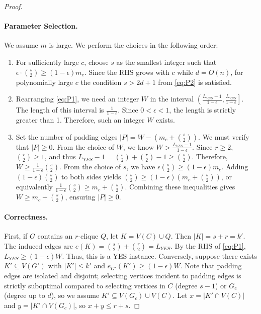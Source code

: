 \begin{proof}
\paragraph{Parameter Selection.}
We assume $m$ is large. We perform the choices in the following order:
\begin{enumerate}
    \item For sufficiently large $c$, choose $s$ as the smallest integer such that $\epsilon \cdot \binom{s}{2} \ge (1-\epsilon) m_c$. Since the RHS grows with $c$ while $d = O(n)$, for polynomially large $c$ the condition $s > 2d +1$ from \eqref{eq:P2} is satisfied.
    
    \item Rearranging \eqref{eq:P1}, we need an integer $W$ in the interval  $ \left( \frac{L_{YES}-1}{1-\epsilon}, \frac{L_{YES}}{1-\epsilon} \right]. $ The length of this interval is $\frac{1}{1-\epsilon}$. Since $0 < \epsilon < 1$, the length is strictly greater than 1. Therefore, such an integer $W$ exists.
    
    \item Set the number of padding edges $|P| = W - (m_c + \binom{s}{2})$. We must verify that $|P| \ge 0$. 
    From the choice of $W$, we know $W > \frac{L_{YES}-1}{1-\epsilon}$. Since $r \ge 2$, $\binom{r}{2} \ge 1$, and thus $L_{YES} - 1 = \binom{s}{2} + \binom{r}{2} - 1 \ge \binom{s}{2}$.
    Therefore, $W \ge \frac{1}{1-\epsilon} \binom{s}{2}$.
    From the choice of $s$, we have $\epsilon \binom{s}{2} \ge (1-\epsilon)m_c$. Adding $(1-\epsilon)\binom{s}{2}$ to both sides yields $\binom{s}{2} \ge (1-\epsilon)(m_c + \binom{s}{2})$, or equivalently $\frac{1}{1-\epsilon}\binom{s}{2} \ge m_c + \binom{s}{2}$.
    Combining these inequalities gives $W \ge m_c + \binom{s}{2}$, ensuring $|P| \ge 0$.
\end{enumerate}


\paragraph{Correctness.}
First, if $G$ contains an $r$-clique $Q$, let $K = V(C) \cup Q$. Then $|K| = s+r = k'$. The induced edges are $e(K) = \binom{s}{2} + \binom{r}{2} = L_{YES}$. By the RHS of \eqref{eq:P1}, $L_{YES} \ge (1-\epsilon)W$. Thus, this is a YES instance. Conversely, suppose there exists $K' \subseteq V(G')$ with $|K'| \le k'$ and $e_{G'}(K') \ge (1-\epsilon)W$. Note that padding edges are isolated and disjoint; selecting vertices incident to padding edges is strictly suboptimal compared to selecting vertices in $C$ (degree $s-1$) or $G_c$ (degree up to $d$), so we assume $K' \subseteq V(G_c) \cup V(C)$.
Let $x = |K' \cap V(C)|$ and $y = |K' \cap V(G_c)|$, so $x+y \le r+s$.


\end{proof}
